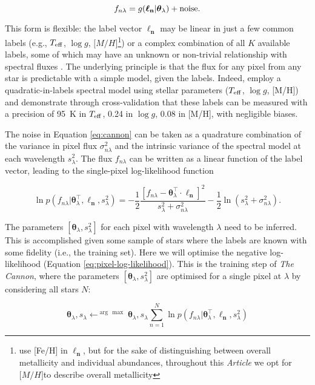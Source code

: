 \documentclass[useAMS,usenatbib]{mn2e}
\newcommand\article{\textit{Article}}
\newcommand\tc{\textit{The Cannon}}
\newcommand\lv{\mathbf{\boldsymbol\ell_n}}
\newcommand\cv{{\boldsymbol\theta}_\lambda}
\newcommand\given{|}
\newcommand\teff{$T_{\rm eff}$}
\newcommand\logg{$\log{g}$}
\newcommand\mh{${\mathrm [M/H]}$}
\begin{document}
\begin{equation}
    f_{n\lambda} = g(\lv\given\cv) + {\rm noise}.
    \label{eq:cannon}
\end{equation}

This form is flexible: the label vector $\lv$ may be linear in just a few common
labels (e.g., \teff, \logg, \mh\footnote{\citet{Ness15a} use [Fe/H] in $\lv$, 
but for the sake of distinguishing between overall metallicity and individual 
abundances, throughout this \article{} we opt for \mh to describe overall 
metallicity}) or a complex combination of all $K$ available labels, some of which
may have an unknown or non-trivial relationship with spectral fluxes \citep[e.g.,
ages, masses, see][]{Nissen15, Ness15b}. The underlying principle is that the 
flux for any pixel from any star is predictable with a simple model, given the
labels. Indeed, \citet{Ness15a} employ a quadratic-in-labels spectral model 
using stellar parameters ($T_{\rm eff}$, $\log{g}$, [M/H]) and demonstrate 
through cross-validation that these labels can be measured with a precision of 
95~K in $T_{\rm eff}$, 0.24 in $\log{g}$, 0.08 in [M/H], with negligible biases. 

The noise in Equation \ref{eq:cannon} can be taken as a quadrature combination
of the variance in pixel flux $\sigma_{n\lambda}^2$ and the intrinsic variance 
of the spectral model at each wavelength $s_\lambda^2$. The flux $f_{n\lambda}$
can be written as a linear function of the label vector, leading to the
single-pixel log-likelihood function

\begin{equation}
\ln{p}\left(f_{n\lambda}\given\cv^\intercal,\lv, s_{\lambda}^2\right) = -\frac{1}{2}\frac{\left[f_{n\lambda} - \cv^{\intercal}\cdot\lv\right]^2}{s_\lambda^2 + \sigma_{n\lambda}^2} -\frac{1}{2}\ln\left(s_{\lambda}^2 + \sigma_{n\lambda}^2\right).
\label{eq:pixel-log-likelihood}
\end{equation}

The parameters $[\cv,s_\lambda^2]$ for each pixel with wavelength $\lambda$ need
to be inferred. This is accomplished given some sample of stars where the labels
are known with some fidelity (i.e., the training set). Here we will optimise the
negative log-likelihood (Equation \ref{eq:pixel-log-likelihood}). This is the 
training step of \tc{}, where the parameters $[\cv,s_\lambda^2]$ are optimised 
for a single pixel at $\lambda$ by considering all stars $N$:

\begin{equation}
\cv,s_\lambda \leftarrow^{\arg\,\max} {\cv, s_\lambda} \sum_{n=1}^N \ln{p}\left(f_{n\lambda}\given\cv^\intercal,\lv,s_\lambda^2\right)
\end{equation}
\end{document}
